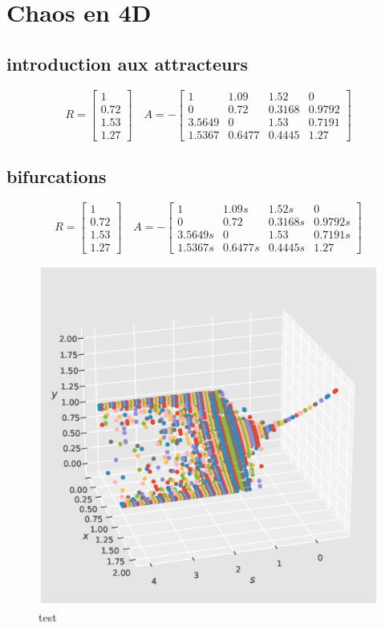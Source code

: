 \documentclass{wsdcr}
\begin{document}
\section{Chaos en 4D}
\subsection{introduction aux attracteurs}
\begin{equation}
R={\begin{bmatrix}1\\0.72\\1.53\\1.27\end{bmatrix}}\quad A =-{\begin{bmatrix}1&1.09&1.52&0\\0&0.72&0.3168&0.9792\\3.5649&0&1.53&0.7191\\1.5367&0.6477&0.4445&1.27\end{bmatrix}}
\end{equation}
\subsection{bifurcations}
\begin{equation}
R={\begin{bmatrix}1\\0.72\\1.53\\1.27\end{bmatrix}}\quad A =-{\begin{bmatrix}1&1.09s&1.52s&0\\0&0.72&0.3168s&0.9792s\\3.5649s&0&1.53&0.7191s\\1.5367s&0.6477s&0.4445s&1.27\end{bmatrix}}
\end{equation}
\begin{figure}[t!]
    \centering
    \includegraphics[width=\linewidth]{fig/lv2_bif3D.eps}
    \caption{test}
    \label{fig:example}
\end{figure}
\end{document}
